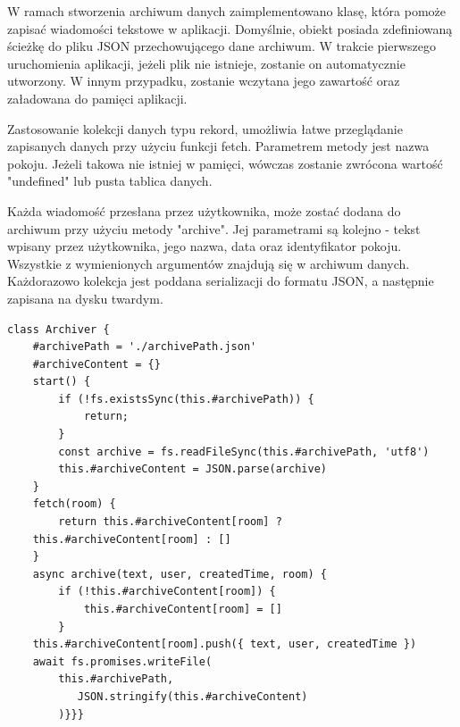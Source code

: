 W ramach stworzenia archiwum danych zaimplementowano klasę, która pomoże zapisać wiadomości tekstowe w aplikacji. Domyślnie, obiekt posiada zdefiniowaną ścieżkę do pliku JSON przechowującego dane archiwum. W trakcie pierwszego uruchomienia aplikacji, jeżeli plik nie istnieje, zostanie on automatycznie utworzony. W innym przypadku, zostanie wczytana jego zawartość oraz załadowana do pamięci aplikacji.

Zastosowanie kolekcji danych typu rekord, umożliwia łatwe przeglądanie zapisanych danych przy użyciu funkcji fetch. Parametrem metody jest nazwa pokoju. Jeżeli takowa nie istniej w pamięci, wówczas zostanie zwrócona wartość "undefined" lub pusta tablica danych.

Każda wiadomość przesłana przez użytkownika, może zostać dodana do archiwum przy użyciu metody "archive". Jej parametrami są kolejno - tekst wpisany przez użytkownika, jego nazwa, data oraz identyfikator pokoju. Wszystkie z wymienionych argumentów znajdują się w archiwum danych. Każdorazowo kolekcja jest poddana serializacji do formatu JSON, a następnie zapisana na dysku twardym.
\newpage
\begin{lstlisting}[caption=Implementacja funkcji archiwizującej wiadomości w komunikatorze]
class Archiver {
    #archivePath = './archivePath.json'
    #archiveContent = {}
    start() {
        if (!fs.existsSync(this.#archivePath)) {
            return;
        }
        const archive = fs.readFileSync(this.#archivePath, 'utf8')
        this.#archiveContent = JSON.parse(archive)
    }
    fetch(room) {
        return this.#archiveContent[room] ? 
	this.#archiveContent[room] : []
    }
    async archive(text, user, createdTime, room) {
        if (!this.#archiveContent[room]) {
            this.#archiveContent[room] = []
        }
    this.#archiveContent[room].push({ text, user, createdTime })
    await fs.promises.writeFile(
    	this.#archivePath,
           JSON.stringify(this.#archiveContent)
        )}}}
\end{lstlisting}


